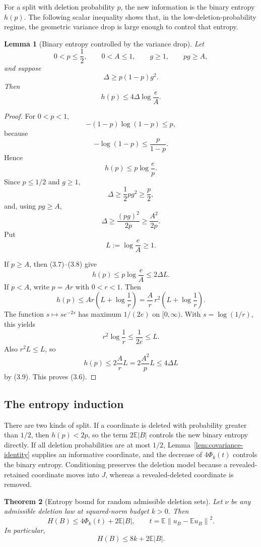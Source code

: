 \documentclass[11pt]{article}
\newtheorem{theorem}{Theorem}[section]
\newtheorem{lemma}[theorem]{Lemma}
\theoremstyle{definition}
\theoremstyle{remark}
\newcommand{\E}{\mathbb E}
\newcommand{\norm}[1]{\left\lVert #1\right\rVert}
\begin{document}
For a split with deletion probability \(p\), the new information is the
binary entropy \(h(p)\). The following scalar inequality shows that, in the
low-deletion-probability regime, the geometric variance drop is large enough
to control that entropy.

\begin{lemma}[Binary entropy controlled by the variance drop]
\label{lem:binary-payment}
Let
\[
 0<p\le\frac12,
 \qquad
 0<A\le1,
 \qquad
 g\ge1,
 \qquad
 pg\ge A,
\]
and suppose
\[
 \Delta\ge p(1-p)g^2.
\]
Then
\[
 \boxed{
 h(p)\le4\Delta\log\frac eA.}
 \tag{3.6}
\]
\end{lemma}

\begin{proof}
For \(0<p<1\),
\[
 -(1-p)\log(1-p)\le p,
\]
because
\[
 -\log(1-p)\le\frac{p}{1-p}.
\]
Hence
\[
 h(p)\le p\log\frac ep.
 \tag{3.7}
\]
Since \(p\le1/2\) and \(g\ge1\),
\[
 \Delta
 \ge
 \frac12pg^2
 \ge
 \frac p2,
 \tag{3.8}
\]
and, using \(pg\ge A\),
\[
 \Delta
 \ge
 \frac{(pg)^2}{2p}
 \ge
 \frac{A^2}{2p}.
 \tag{3.9}
\]
Put
\[
 L:=\log\frac eA\ge1.
\]

If \(p\ge A\), then (3.7)--(3.8) give
\[
 h(p)
 \le
 p\log\frac eA
 \le
 2\Delta L.
\]
If \(p<A\), write \(p=Ar\) with \(0<r<1\). Then
\[
 h(p)
 \le
 Ar\left(L+\log\frac1r\right)
 =
 \frac A r\,r^2\left(L+\log\frac1r\right).
\]
The function \(s\mapsto se^{-2s}\) has maximum \(1/(2e)\) on
\([0,\infty)\). With \(s=\log(1/r)\), this yields
\[
 r^2\log\frac1r\le\frac1{2e}\le L.
\]
Also \(r^2L\le L\), so
\[
 h(p)
 \le
 2\frac A r L
 =
 2\frac{A^2}{p}L
 \le
 4\Delta L
\]
by (3.9). This proves (3.6).
\end{proof}

\subsection{The entropy induction}

There are two kinds of split. If a coordinate is deleted with probability
greater than \(1/2\), then \(h(p)<2p\), so the term \(2\E|B|\) controls the
new binary entropy directly. If all deletion probabilities are at most
\(1/2\), Lemma~\ref{lem:covariance-identity} supplies an informative
coordinate, and the decrease of \(4\Phi_k(t)\) controls the binary entropy.
Conditioning preserves the deletion model because a revealed-retained
coordinate moves into \(J\), whereas a revealed-deleted coordinate is
removed.

\begin{theorem}[Entropy bound for random admissible deletion sets]
\label{thm:entropy}
Let \(\nu\) be any admissible deletion law at squared-norm budget \(k>0\). Then
\[
 \boxed{
 H(B)
 \le
 4\Phi_k(t)+2\E|B|,}
 \qquad
 t=\E\norm{u_B-\E u_B}^2.
 \tag{3.10}
\]
In particular,
\[
 \boxed{
 H(B)\le8k+2\E|B|.}
 \tag{3.11}
\]
\end{theorem}
\end{document}
